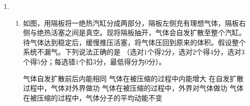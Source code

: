 \begin{enumerate}[leftmargin=0em]
\begin{enumerate}
\begin{minipage}[h!]{0.7\linewidth}
\vspace{0.3em}

\vspace{0.3em}
\end{minipage}
\hfill
\begin{minipage}[h!]{0.3\linewidth}
\flushright
\vspace{0.3em}

\vspace{0.3em}
\end{minipage}




\end{enumerate}



\newpage	
\item 
{}
\begin{enumerate}
\renewcommand{\labelenumi}{\arabic{enumi}.}
\item
如图，用隔板将一绝热汽缸分成两部分，隔板左侧充有理想气体，隔板右侧与绝热活塞之间是真空。现将隔板抽开，气体会自发扩散至整个汽缸。待气体达到稳定后，缓慢推压活塞，将气体压回到原来的体积。假设整个系统不漏气。下列说法正确的是  
（选对$ 1 $个得$ 2 $分，选对$ 2 $个得$ 4 $分，选对$ 3 $个得$ 5 $分；每选错$ 1 $个扣$ 3 $分，最低得分为$ 0 $分）。
\begin{figure}[h!]
\centering

\end{figure}

\fivechoices
{气体自发扩散前后内能相同}
{气体在被压缩的过程中内能增大}
{在自发扩散过程中，气体对外界做功}
{气体在被压缩的过程中，外界对气体做功}
{气体在被压缩的过程中，气体分子的平均动能不变}




\end{enumerate}
\end{enumerate}
